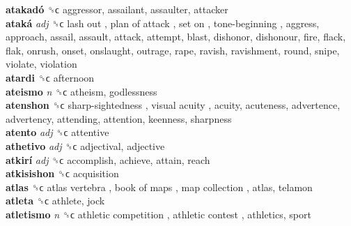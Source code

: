 \textbf{atakadó} ␝ϲ  aggressor, assailant, assaulter, attacker  \\
\textbf{ataká} \emph{adj}  ␝ϲ   lash out ,  plan of attack ,  set on ,  tone-beginning , aggress, approach, assail, assault, attack, attempt, blast, dishonor, dishonour, fire, flack, flak, onrush, onset, onslaught, outrage, rape, ravish, ravishment, round, snipe, violate, violation  \\
\textbf{atardi} ␝ϲ  afternoon  \\
\textbf{ateismo} \emph{n}  ␝ϲ  atheism, godlessness  \\
\textbf{atenshon} ␝ϲ   sharp-sightedness ,  visual acuity , acuity, acuteness, advertence, advertency, attending, attention, keenness, sharpness  \\
\textbf{atento} \emph{adj}  ␝ϲ  attentive  \\
\textbf{athetivo} \emph{adj}  ␝ϲ  adjectival, adjective  \\
\textbf{atkirí} \emph{adj}  ␝ϲ  accomplish, achieve, attain, reach  \\
\textbf{atkisishon} ␝ϲ  acquisition  \\
\textbf{atlas} ␝ϲ   atlas vertebra ,  book of maps ,  map collection , atlas, telamon  \\
\textbf{atleta} ␝ϲ  athlete, jock  \\
\textbf{atletismo} \emph{n}  ␝ϲ   athletic competition ,  athletic contest , athletics, sport  \\
